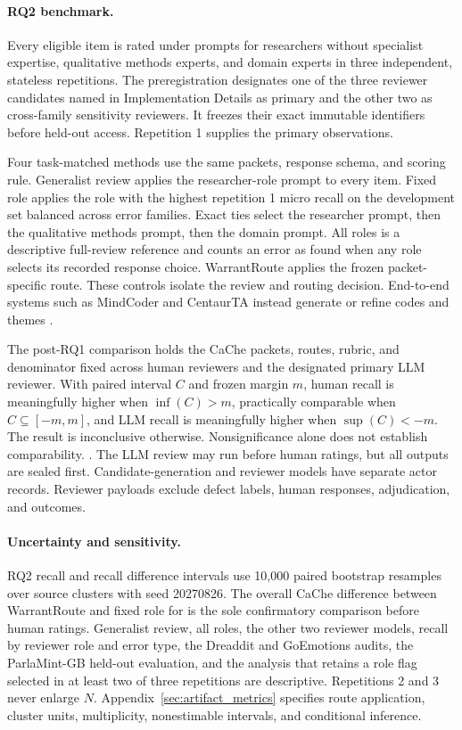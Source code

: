 \paragraph{RQ2 benchmark.}
Every eligible item is rated under prompts for researchers without specialist expertise, qualitative methods experts, and domain experts in three independent, stateless repetitions. The preregistration designates one of the three reviewer candidates named in Implementation Details as primary and the other two as cross-family sensitivity reviewers. It freezes their exact immutable identifiers before held-out access. Repetition 1 supplies the primary observations.

Four task-matched methods use the same packets, response schema, and scoring rule. Generalist review applies the researcher-role prompt to every item. Fixed role applies the role with the highest repetition 1 micro recall on the development set balanced across error families. Exact ties select the researcher prompt, then the qualitative methods prompt, then the domain prompt. All roles is a descriptive full-review reference and counts an error as found when any role selects its recorded response choice. WarrantRoute applies the frozen packet-specific route. These controls isolate the review and routing decision. End-to-end systems such as MindCoder and CentaurTA instead generate or refine codes and themes \citep{gao2025mindcoder,wang2026centaurta}.

The post-RQ1 comparison holds the CaChe packets, routes, rubric, and denominator fixed across human reviewers and the designated primary LLM reviewer. With paired interval \(C\) and frozen margin \(m\), human recall is meaningfully higher when \(\inf(C)>m\), practically comparable when \(C\subseteq[-m,m]\), and LLM recall is meaningfully higher when \(\sup(C)<-m\). The result is inconclusive otherwise. Nonsignificance alone does not establish comparability. . The LLM review may run before human ratings, but all outputs are sealed first. Candidate-generation and reviewer models have separate actor records. Reviewer payloads exclude defect labels, human responses, adjudication, and outcomes.

\paragraph{Uncertainty and sensitivity.}
RQ2 recall and recall difference intervals use 10,000 paired bootstrap resamples over source clusters with seed 20270826. The overall CaChe difference between WarrantRoute and fixed role for  is the sole confirmatory comparison before human ratings. Generalist review, all roles, the other two reviewer models, recall by reviewer role and error type, the Dreaddit and GoEmotions audits, the ParlaMint-GB held-out evaluation, and the analysis that retains a role flag selected in at least two of three repetitions are descriptive. Repetitions 2 and 3 never enlarge \(N\). Appendix~\ref{sec:artifact_metrics} specifies route application, cluster units, multiplicity, nonestimable intervals, and conditional inference.

